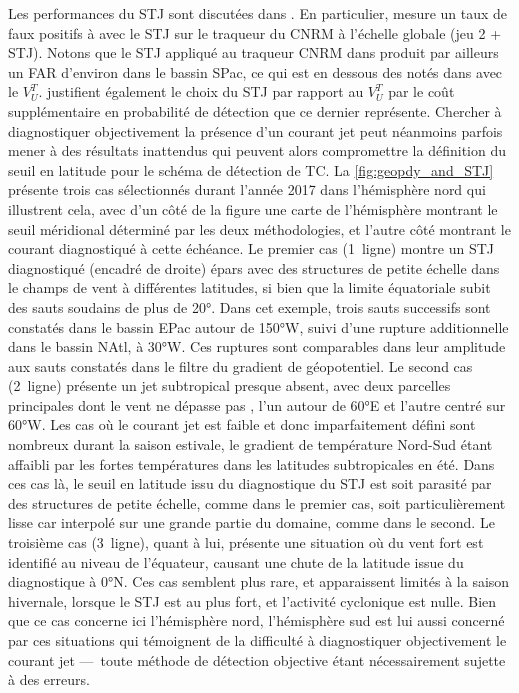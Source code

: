 \documentclass[../main.tex]{subfiles}
\begin{document}
Les performances du STJ sont discutées dans \textcite{bourdin_intercomparison_2022}. En particulier, \textcite{bourdin_intercomparison_2022} mesure un taux de
faux positifs à  avec le STJ sur le traqueur du CNRM à l'échelle globale (jeu 2 + STJ). Notons que le STJ appliqué au traqueur CNRM dans
\textcite{bourdin_intercomparison_2022} produit par ailleurs un FAR d'environ  dans le bassin SPac, ce qui est en dessous des  notés dans
\textcite{dulac_assessing_2023} avec le $V_U^T$. \textcite{bourdin_intercomparison_2022} justifient également le choix du STJ par rapport au $V_U^T$ par le coût
supplémentaire en probabilité de détection que ce dernier représente. Chercher à diagnostiquer objectivement la présence d'un courant jet peut néanmoins parfois
mener à des résultats inattendus qui peuvent alors compromettre la définition du seuil en latitude pour le schéma de détection de TC. La
\cref{fig:geopdy_and_STJ} présente trois cas sélectionnés durant l'année 2017 dans l'hémisphère nord qui illustrent cela, avec d'un côté de la figure une carte
de l'hémisphère montrant le seuil méridional déterminé par les deux méthodologies, et l'autre côté montrant le courant diagnostiqué à cette échéance. Le premier
cas (1\iere~ligne) montre un STJ diagnostiqué (encadré de droite) épars avec des structures de petite échelle dans le champs de vent à différentes latitudes, si
bien que la limite équatoriale subit des sauts soudains de plus de \ang{20}. Dans cet exemple, trois sauts successifs sont constatés dans le bassin EPac autour
de \ang{150}W, suivi d'une rupture additionnelle dans le bassin NAtl, à \ang{30}W. Ces ruptures sont comparables dans leur amplitude aux sauts constatés dans le
filtre du gradient de géopotentiel. Le second cas (2\ieme~ligne) présente un jet subtropical presque absent, avec deux parcelles principales dont le vent ne
dépasse pas , l'un autour de \ang{60}E et l'autre centré sur \ang{60}W. Les cas où le courant jet est faible et donc imparfaitement défini sont nombreux
durant la saison estivale, le gradient de température Nord-Sud étant affaibli par les fortes températures dans les latitudes subtropicales en été. Dans ces cas
là, le seuil en latitude issu du diagnostique du STJ est soit parasité par des structures de petite échelle, comme dans le premier cas, soit particulièrement
lisse car interpolé sur une grande partie du domaine, comme dans le second. Le troisième cas (3\ieme~ligne), quant à lui, présente une situation où du vent fort
est identifié au niveau de l'équateur, causant une chute de la latitude issue du diagnostique à \ang{0}N. Ces cas semblent plus rare, et apparaissent limités à
la saison hivernale, lorsque le STJ est au plus fort, et l'activité cyclonique est nulle. Bien que ce cas concerne ici l'hémisphère nord, l'hémisphère sud est
lui aussi concerné par ces situations qui témoignent de la difficulté à diagnostiquer objectivement le courant jet ---~toute méthode de détection objective
étant nécessairement sujette à des erreurs.
\end{document}
